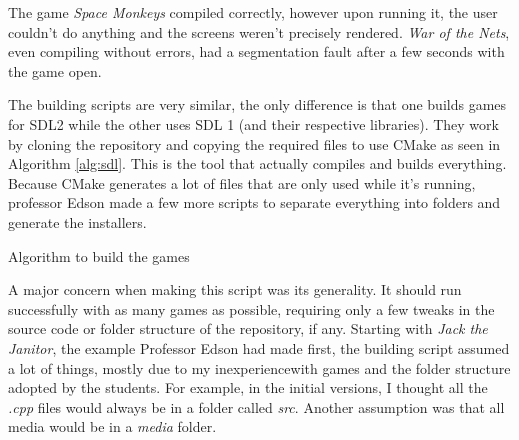 The game \textit{Space Monkeys} compiled correctly, however upon running it, the user couldn't do anything and the screens weren't precisely rendered. \textit{War of the Nets}, even compiling without errors, had a segmentation fault after a few seconds with the game open.

The building scripts are very similar, the only difference is that one builds games for SDL2 while the other uses SDL 1 (and their respective libraries). They work by cloning the repository and copying the required files to use CMake as seen in Algorithm \ref{alg:sdl}. This is the tool that actually compiles and builds everything. Because CMake generates a lot of files that are only used while it's running, professor Edson made a few more scripts to separate everything into folders and generate the installers.

\begin{algorithm}[h!]
\caption{Algorithm to build the games}
\label{alg:sdl}
\begin{algorithmic}
\Start
{}  
\State {} 
 
 
\State {} 
\State {} 
\State {} 
\State {} 
\End
\end{algorithmic}
\end{algorithm}


A major concern when making this script was its generality. It should run successfully with as many games as possible, requiring only a few tweaks in the source code or folder structure of the repository, if any. Starting with \textit{Jack the Janitor}, the example Professor Edson had made first, the  building script assumed a lot of things, mostly due to my inexperiencewith games and the folder structure adopted by the students. For example, in the initial versions, I thought all the \textit{.cpp} files would always be in a folder called \textit{src}. Another assumption was that all media would be in a \textit{media} folder.

